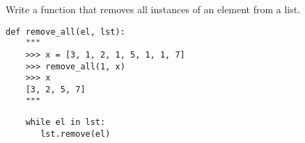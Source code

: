 \question Write a function that removes all instances of an element from a list.
\begin{lstlisting}
def remove_all(el, lst):
    """
    >>> x = [3, 1, 2, 1, 5, 1, 1, 7]
    >>> remove_all(1, x)
    >>> x
    [3, 2, 5, 7]
    """
\end{lstlisting}
\begin{solution}[1.2in]
\begin{lstlisting}
    while el in lst:
       lst.remove(el)
\end{lstlisting}
\end{solution}

